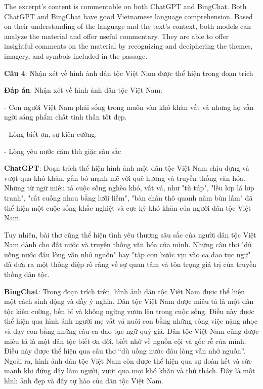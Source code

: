 \documentclass{article}
\begin{document}
{\begin{mdframed}[linewidth=1pt,linecolor=red]
	\end{mdframed}
	
	The excerpt's content is commentable on both ChatGPT and BingChat. Both ChatGPT and BingChat have good Vietnamese language comprehension. Based on their understanding of the language and the text's context, both models can analyze the material and offer useful commentary. They are able to offer insightful comments on the material by recognizing and deciphering the themes, imagery, and symbols included in the passage.
	
	
	\begin{mdframed}[linewidth=1pt,linecolor=red] 		
\textbf{Câu 4}: Nhận xét về hình ảnh dân tộc Việt Nam được thể hiện trong đoạn trích 
		
\textbf{Đáp án}: Nhận xét về hình ảnh dân tộc Việt Nam:
		
		- Con người Việt Nam phải sống trong muôn vàn khó khăn vất vả nhưng họ vẫn ngời sáng phẩm chất tinh thần tốt đẹp.
		
		- Lòng biết ơn, sự kiên cường.
		
		- Lòng yêu nước căm thù giặc sâu sắc
		
		\textbf{ChatGPT}: Đoạn trích thể hiện hình ảnh một dân tộc Việt Nam chịu đựng và vượt qua khó khăn, gắn bó mạnh mẽ với quê hương và truyền thống văn hóa. Những từ ngữ miêu tả cuộc sống nghèo khó, vất vả, như "tù túp", "lều lơp lá lơp tranh", "cắt cuống nhau bằng lưỡi liềm", "bàn chân thô quanh năm bùn lấm" đã thể hiện một cuộc sống khắc nghiệt và cực kỳ khó khăn của người dân tộc Việt Nam.
		
		Tuy nhiên, bài thơ cũng thể hiện tình yêu thương sâu sắc của người dân tộc Việt Nam dành cho đất nước và truyền thống văn hóa của mình. Những câu thơ "dù uống nước đâu lòng vẫn nhớ nguồn" hay "tập con bước vịn vào ca dao tục ngữ" đã đưa ra một thông điệp rõ ràng về sự quan tâm và tôn trọng giá trị của truyền thống dân tộc.
		
		\textbf{BingChat}: Trong đoạn trích trên, hình ảnh dân tộc Việt Nam được thể hiện một cách sinh động và đầy ý nghĩa. Dân tộc Việt Nam được miêu tả là một dân tộc kiên cường, bền bỉ và không ngừng vươn lên trong cuộc sống. Điều này được thể hiện qua hình ảnh người mẹ vất vả nuôi con bằng những công việc nặng nhọc và dạy con bằng những câu ca dao tục ngữ quý giá. Dân tộc Việt Nam cũng được miêu tả là một dân tộc biết ơn đời, biết nhớ về nguồn cội và gốc rễ của mình. Điều này được thể hiện qua câu thơ “dù uống nước đâu lòng vẫn nhớ nguồn”. Ngoài ra, hình ảnh dân tộc Việt Nam còn được thể hiện qua sự đoàn kết và sức mạnh khi đứng dậy làm người, vượt qua mọi khó khăn và thử thách. Đây là một hình ảnh đẹp và đầy tự hào của dân tộc Việt Nam.
	\end{mdframed}
	
}
\end{document}
